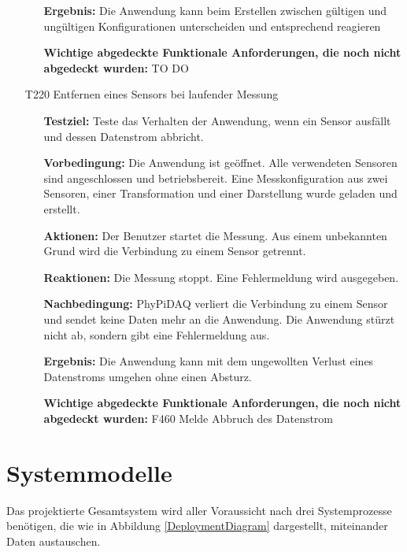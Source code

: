 \documentclass[parskip=full]{scrartcl}
\begin{document}
\begin{itemize}
\begin{itemize}
\item []\textbf{Ergebnis:} Die Anwendung kann beim Erstellen zwischen gültigen und ungültigen Konfigurationen unterscheiden und entsprechend reagieren
\item []\textbf{Wichtige abgedeckte Funktionale Anforderungen, die noch nicht abgedeckt wurden:} TO DO

\end{itemize}

\item[T220] Entfernen eines Sensors bei laufender Messung
\begin{itemize}

\item []\textbf{Testziel:} Teste das Verhalten der Anwendung, wenn ein Sensor ausfällt und dessen Datenstrom abbricht.

\item []\textbf{Vorbedingung:} Die Anwendung ist geöffnet. Alle verwendeten Sensoren sind angeschlossen und betriebsbereit. Eine Messkonfiguration aus zwei Sensoren, einer Transformation und einer Darstellung wurde geladen und erstellt.
\item []\textbf{Aktionen:} Der Benutzer startet die Messung. Aus einem unbekannten Grund wird die Verbindung zu einem Sensor getrennt.
\item []\textbf{Reaktionen:} Die Messung stoppt. Eine Fehlermeldung wird ausgegeben.
\item []\textbf{Nachbedingung:} \gls{PhyPiDAQ} verliert die Verbindung zu einem Sensor und sendet keine Daten mehr an die Anwendung. Die Anwendung stürzt nicht ab, sondern gibt eine Fehlermeldung aus.

\item []\textbf{Ergebnis:} Die Anwendung kann mit dem ungewollten Verlust eines Datenstroms umgehen ohne einen Absturz.
\item []\textbf{Wichtige abgedeckte Funktionale Anforderungen, die noch nicht abgedeckt wurden:} F460 Melde Abbruch des Datenstrom

\end{itemize}


\end{itemize}


\section{Systemmodelle}\label{systemmodell}

Das projektierte Gesamtsystem wird aller Voraussicht nach drei Systemprozesse benötigen, die wie in Abbildung \ref{DeploymentDiagram} dargestellt, miteinander Daten austauschen.
\end{document}
